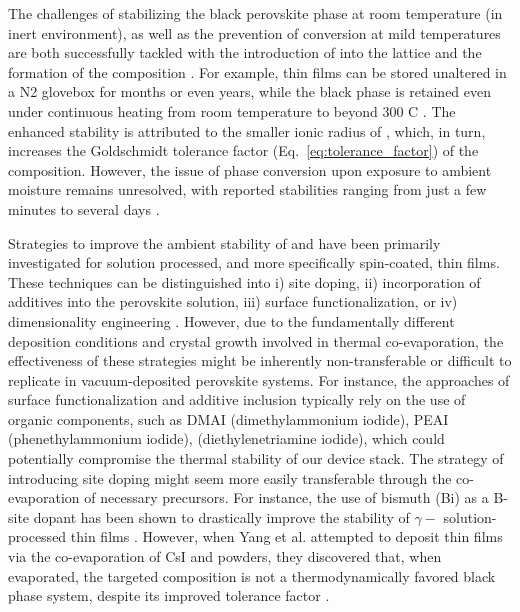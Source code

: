 The challenges of stabilizing the black perovskite phase at room temperature (in inert environment), as well as the prevention of conversion at mild temperatures are both successfully tackled with the introduction of  into the lattice and the formation of the  composition \cite{Sutton2016Bandgap-TunableCells}. For example,  thin films can be stored unaltered in a N2 glovebox for months or even years, while the black phase is retained even under continuous heating from room temperature to beyond 300\degree 
C \cite{Papadopoulou2024InEllipsometry}. The enhanced stability is attributed to the smaller ionic radius of , which, in turn, increases the Goldschmidt tolerance factor (Eq.~\ref{eq:tolerance_factor}) of the composition. However, the issue of phase conversion upon exposure to ambient moisture remains unresolved, with reported stabilities ranging from just a few minutes to several days \cite{Zhu2022UnderstandingPerovskites, Zheng2021ImprovedCells, Mariotti2018StabilityDevices}. 

Strategies to improve the ambient stability of  and  have been primarily investigated for solution processed, and more specifically spin-coated, thin films. These techniques can be distinguished into i)  site doping, ii) incorporation of additives into the perovskite solution, iii) surface functionalization, or iv) dimensionality engineering \cite{Jin2024PhaseDevices}. However, due to the fundamentally different deposition conditions and crystal growth involved in thermal co-evaporation, the effectiveness of these strategies might be inherently non-transferable or difficult to replicate in vacuum-deposited perovskite systems. For instance, the approaches of surface functionalization and additive inclusion typically rely on the use of organic components, such as DMAI (dimethylammonium iodide), PEAI (phenethylammonium iodide),  (diethylenetriamine iodide), which could potentially compromise the thermal stability of our device stack. The strategy of introducing  site doping might seem more easily transferable through the co-evaporation of necessary precursors. For instance, the use of bismuth (Bi) as a B-site dopant has been shown to drastically improve the stability of $\gamma-$ solution-processed thin films \cite{Hu2017BismuthCells}. However, when Yang et al. attempted to deposit  thin films via the co-evaporation of CsI and  powders, they discovered that, when evaporated, the targeted composition is not a thermodynamically favored black phase system, despite its improved tolerance factor \cite{Yang2021CanPhase}.


